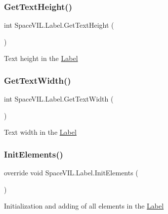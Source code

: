 \subsubsection{\texorpdfstring{Get\+Text\+Height()}{GetTextHeight()}}
{\footnotesize\ttfamily int Space\+V\+I\+L.\+Label.\+Get\+Text\+Height (\begin{DoxyParamCaption}{ }\end{DoxyParamCaption})}



Text height in the \mbox{\hyperlink{class_space_v_i_l_1_1_label}{Label}} 

\mbox{\label{class_space_v_i_l_1_1_label_a679b77d3cf9beaa4b470782b40e91cca}} 
\subsubsection{\texorpdfstring{Get\+Text\+Width()}{GetTextWidth()}}
{\footnotesize\ttfamily int Space\+V\+I\+L.\+Label.\+Get\+Text\+Width (\begin{DoxyParamCaption}{ }\end{DoxyParamCaption})}



Text width in the \mbox{\hyperlink{class_space_v_i_l_1_1_label}{Label}} 

\mbox{\label{class_space_v_i_l_1_1_label_a2bdc7da304e91a50a820b8c8f722c0be}} 
\subsubsection{\texorpdfstring{Init\+Elements()}{InitElements()}}
{\footnotesize\ttfamily override void Space\+V\+I\+L.\+Label.\+Init\+Elements (\begin{DoxyParamCaption}{ }\end{DoxyParamCaption})\hspace{0.3cm}{\ttfamily [virtual]}}



Initialization and adding of all elements in the \mbox{\hyperlink{class_space_v_i_l_1_1_label}{Label}} 




